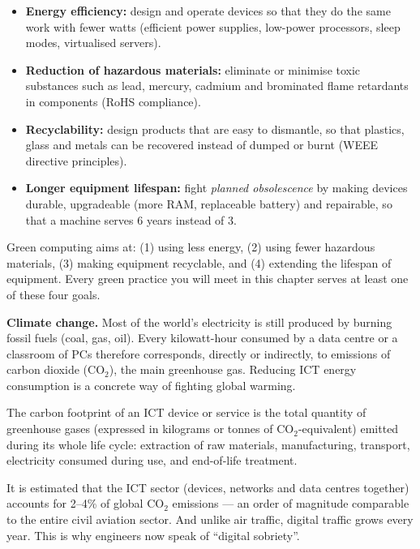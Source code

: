 \documentclass[11pt]{article}
\newcommand{\cle}[1]{{\popxbold\color{popdark}#1}}
\newcounter{popsec}
\newcounter{popsub}
\newcommand{\courssub}[1]{%
  \stepcounter{popsub}%
  \par\vspace{9pt}\noindent{\popxbold\fontsize{11.5}{13}\selectfont\color{popink}{\color{poporange}\thepopsec.\thepopsub}\hspace{6pt}#1}\par\nopagebreak\vspace{4pt}
}
\begin{document}
\begin{itemize}
\item \textbf{Energy efficiency:} design and operate devices so that they do the same work with fewer watts (efficient power supplies, low-power processors, sleep modes, virtualised servers).
\item \textbf{Reduction of hazardous materials:} eliminate or minimise toxic substances such as lead, mercury, cadmium and brominated flame retardants in components (RoHS compliance).
\item \textbf{Recyclability:} design products that are easy to dismantle, so that plastics, glass and metals can be recovered instead of dumped or burnt (WEEE directive principles).
\item \textbf{Longer equipment lifespan:} fight \emph{planned obsolescence} by making devices durable, upgradeable (more RAM, replaceable battery) and repairable, so that a machine serves 6 years instead of 3.
\end{itemize}

\begin{aretenir}
Green computing aims at: (1) using less \cle{energy}, (2) using fewer \cle{hazardous materials}, (3) making equipment \cle{recyclable}, and (4) extending the \cle{lifespan} of equipment. Every green practice you will meet in this chapter serves at least one of these four goals.
\end{aretenir}

\courssub{Why Green Computing Matters}

\textbf{Climate change.} Most of the world's electricity is still produced by burning fossil fuels (coal, gas, oil). Every kilowatt-hour consumed by a data centre or a classroom of PCs therefore corresponds, directly or indirectly, to emissions of carbon dioxide ($\mathrm{CO_2}$), the main greenhouse gas. Reducing ICT energy consumption is a concrete way of fighting global warming.

\begin{definition}
The \cle{carbon footprint} of an ICT device or service is the total quantity of greenhouse gases (expressed in kilograms or tonnes of $\mathrm{CO_2}$-equivalent) emitted during its whole life cycle: extraction of raw materials, manufacturing, transport, electricity consumed during use, and end-of-life treatment.
\end{definition}

\begin{savaistu}
It is estimated that the ICT sector (devices, networks and data centres together) accounts for 2--4\% of global $\mathrm{CO_2}$ emissions --- an order of magnitude comparable to the entire civil aviation sector. And unlike air traffic, digital traffic grows every year. This is why engineers now speak of ``digital sobriety''.
\end{savaistu}
\end{document}
